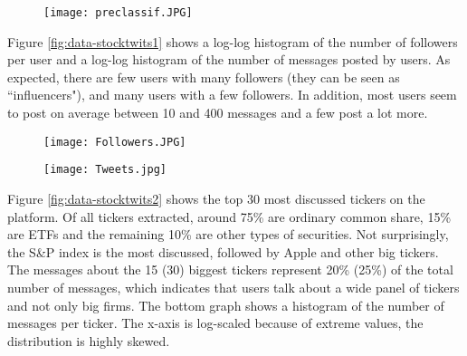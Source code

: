 \begin{figure*}[h]
\centering
        \begin{subfigure}[b]{0.75\textwidth}   
            \centering 
            \texttt{[image: preclassif.JPG]}
        \end{subfigure}
        \caption{Number of user-labeled messages in each category. There are around 60 million unlabeled messages that we classify using the 30 million user-labeled bullish and bearish messages.} 
        \label{categrepartition-preclassif}
\end{figure*}



Figure \ref{fig:data-stocktwits1} shows a log-log histogram of the number of followers per user and a log-log histogram of the number of messages posted by users. As expected, there are few users with many followers (they can be seen as ``influencers"), and many users with a few followers. In addition, most users seem to post on average between 10 and 400 messages and a few post a lot more. 


\begin{figure*}[]
\centering
        \begin{subfigure}{0.75\textwidth}   
            \centering 
            \texttt{[image: Followers.JPG]}
        \end{subfigure}
        \quad
        \begin{subfigure}{0.75\textwidth}
            \centering
            \texttt{[image: Tweets.jpg]}
        \end{subfigure}

        \caption{User summary statistics. Top graph is a log-log histogram of the number of followers per user and the bottom graph shows the log-log histogram of the number of messages posted by users.} 
        \label{fig:data-stocktwits1}
\end{figure*}


Figure \ref{fig:data-stocktwits2} shows the top 30 most discussed tickers on the platform. Of all tickers extracted, around 75\% are ordinary common share, 15\% are ETFs and the remaining 10\% are other types of securities. Not surprisingly, the S\&P index is the most discussed, followed by Apple and other big tickers. The messages about the 15 (30) biggest tickers represent 20\% (25\%) of the total number of messages, which indicates that users talk about a wide panel of tickers and not only big firms. The bottom graph shows a histogram of the number of messages per ticker. The x-axis is log-scaled because of extreme values, the distribution is highly skewed. 

